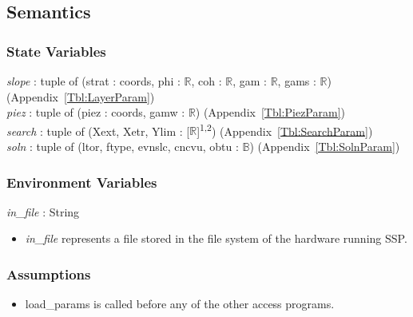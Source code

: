 \documentclass[12pt, titlepage]{article}
\newcommand{\progname}{SSP}
\begin{document}

\subsection{Semantics}

\subsubsection{State Variables}

\textit{slope} : tuple of (strat : coords, phi : $\mathbb{R}$, coh : 
$\mathbb{R}$, gam : $\mathbb{R}$, gams : $\mathbb{R}$) 
(Appendix~\ref{Tbl:LayerParam})\\
\textit{piez} : tuple of (piez : coords, gamw : $\mathbb{R}$) 
(Appendix~\ref{Tbl:PiezParam})\\
\textit{search} : tuple of (Xext, Xetr, Ylim : 
[$\mathbb{R}$]\textsuperscript{1,2}) (Appendix~\ref{Tbl:SearchParam})\\
\textit{soln} : tuple of (ltor, ftype, evnslc, cncvu, obtu : 
$\mathbb{B}$) (Appendix~\ref{Tbl:SolnParam})\\

\subsubsection{Environment Variables}

\textit{in\_file} : String
\begin{itemize}
	\item \textit{in\_file} represents a file stored in the file system of the 
	hardware running \progname{}. \\
\end{itemize}

\subsubsection{Assumptions}
\begin{itemize}
	\item load\_params is called before any of the other access programs.
\end{itemize}
\end{document}
